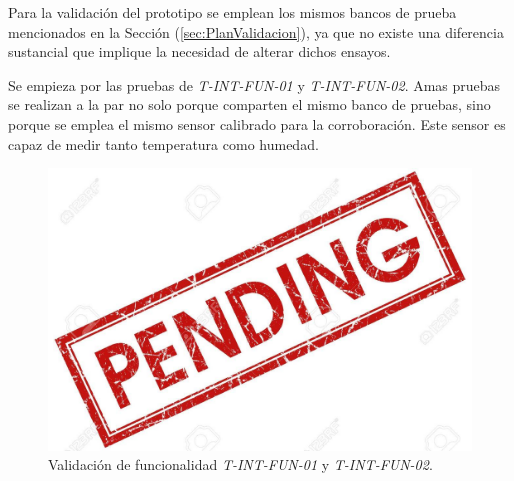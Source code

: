 Para la validación del prototipo se emplean los mismos bancos de prueba mencionados en la Sección (\ref{sec:PlanValidacion}), ya que no existe una diferencia sustancial que implique la necesidad de alterar dichos ensayos.


Se empieza por las pruebas de \textit{T-INT-FUN-01} y \textit{T-INT-FUN-02}. Amas pruebas se realizan a la par no solo porque comparten el mismo banco de pruebas, sino porque se emplea el mismo sensor calibrado para la corroboración. Este sensor es capaz de medir tanto temperatura como humedad.
\begin{figure}[H]
	\centering
    \includegraphics[width=0.7\linewidth]{ImagenesValidacion del prototipo/pend}
	\caption{Validación de funcionalidad \textit{T-INT-FUN-01} y \textit{T-INT-FUN-02}.}
\end{figure}


